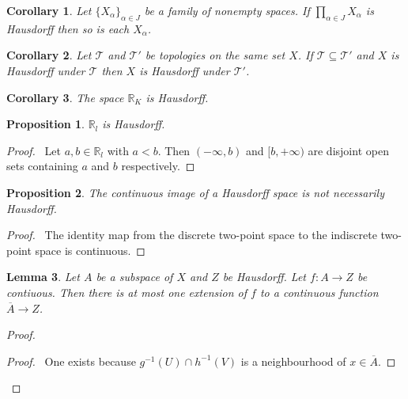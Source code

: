 \documentclass{report}
\let\qed\relax
\newtheorem{lm}{Lemma}[section]
\newtheorem{prop}[lm]{Proposition}
\newtheorem{cor}{Corollary}[lm]
\theoremstyle{definition}
\newcommand{\inv}[1]{\ensuremath{{#1}^{-1}}}
\begin{document}
  \begin{cor}
    Let $\{ X_\alpha \}_{\alpha \in J}$ be a family of nonempty spaces. If
    $\prod_{\alpha \in J} X_\alpha$ is Hausdorff then so is each $X_\alpha$.
  \end{cor}

  \begin{cor}
    Let $\mathcal{T}$ and $\mathcal{T}'$ be topologies on the same set $X$. If
    $\mathcal{T} \subseteq \mathcal{T}'$ and $X$ is Hausdorff under
    $\mathcal{T}$ then $X$ is Hausdorff under $\mathcal{T}'$.
  \end{cor}

  \begin{cor}
    The space $\mathbb{R}_K$ is Hausdorff.
  \end{cor}

   \begin{prop}
   $\mathbb{R}_l$ is Hausdorff.
 \end{prop}

 \begin{proof}
   \pf\ Let $a, b \in \mathbb{R}_l$ with $a < b$. Then $(- \infty, b)$ and $[b,
+\infty)$ are disjoint open sets containing $a$ and $b$ respectively. \qed
 \end{proof}

 \begin{prop}
   The continuous image of a Hausdorff space is not necessarily Hausdorff.
 \end{prop}

 \begin{proof}
   \pf\ The identity map from the discrete two-point space to the indiscrete two-point space is continuous. \qed
 \end{proof}

 \begin{lm}
   \label{lm:topology:Hausdorff:continuous_extension}
   Let $A$ be a subspace of $X$ and $Z$ be Hausdorff. Let $f : A \rightarrow Z$ be contiuous. Then there is at most one extension of $f$ to a continuous function $\overline{A} \rightarrow Z$.
 \end{lm}

 \begin{proof}
   \pf
   \step{<1>3}{\pick\ a point $a \in A \cap \inv{g}(U) \cap \inv{h}(V)$}
   \begin{proof}
     \pf\ One exists because $\inv{g}(U) \cap \inv{h}(V)$ is a neighbourhood of $x \in \overline{A}$.
   \end{proof}
   \qed
 \end{proof}
\end{document}
